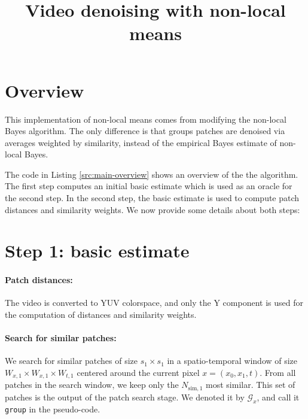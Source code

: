 \documentclass[a4paper,10pt]{article}
\title{Video denoising with non-local means}
\author{}
\date{}
\begin{document}
\maketitle
{}

\section*{Overview}

This implementation of non-local means comes from modifying the non-local Bayes
algorithm. The only difference is that groups patches are denoised via averages
weighted by similarity, instead of the empirical Bayes estimate of non-local Bayes.

The code in Listing \ref{src:main-overview} shows an overview of the the
algorithm. The first step computes an initial basic estimate which is used as an
oracle for the second step. In the second step, the basic estimate is used
to compute patch distances and similarity weights. We now provide some details
about both steps:

\section*{Step 1: basic estimate}

\paragraph{Patch distances:} The video is converted to YUV colorspace, and only
the Y component is used for the computation of distances and similarity
weights.

\paragraph{Search for similar patches:} We search for similar patches of size
$s_1\times s_1$ in a spatio-temporal window of size $W_{x,1}\times W_{x,1}\times
W_{t,1}$ centered around the current pixel $x = (x_0, x_1, t)$. From all
patches in the search window, we keep only
the $N_{\text{sim},1}$ most similar. This set of patches is the output of the
patch search stage. We denoted it by $\mathcal G_x$, and call it \verb+group+
in the pseudo-code.
\end{document}
